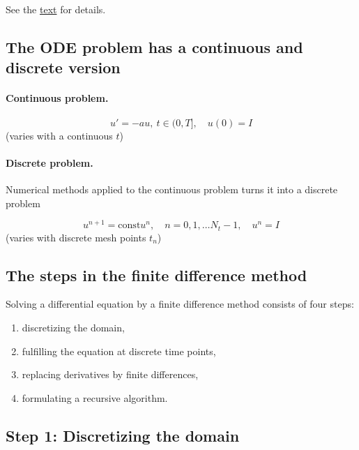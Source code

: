 \documentclass[%
oneside,                 %
final,                   %
10pt]{article}
\begin{document}
\noindent
See the \href{{http://tinyurl.com/nclmcng/pub/sphinx-decay/._main_decay008.html}}{text} for details.

\subsection*{The ODE problem has a continuous and discrete version}

\paragraph{Continuous problem.}
\begin{equation}
u' = -au,\ t\in (0,T], \quad u(0)=I
\label{decay:problem}
\end{equation}
(varies with a continuous $t$)

\paragraph{Discrete problem.}
Numerical methods applied to the continuous problem turns it into
a discrete problem

\begin{equation}
u^{n+1} = \mbox{const} u^n, \quad n=0,1,\ldots N_t-1, \quad u^n=I
\label{decay:problem:discrete}
\end{equation}
(varies with discrete mesh points $t_n$)



\subsection*{The steps in the finite difference method}
\label{decay:schemes:keysteps}

Solving a differential equation by a finite difference method
consists of four steps:

\begin{enumerate}
\item discretizing the domain,

\item fulfilling the equation at discrete time points,

\item replacing derivatives by finite differences,

\item formulating a recursive algorithm.
\end{enumerate}

\noindent
\subsection*{Step 1: Discretizing the domain}
\end{document}

